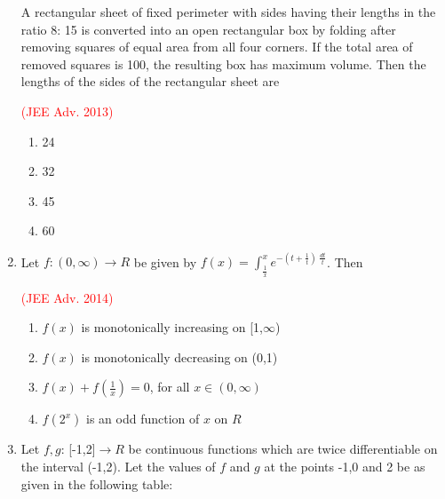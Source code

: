 \documentclass[journal,12pt,twocolumn]{IEEEtran}
\theoremstyle{remark}
\begin{document}
\begin{enumerate}[start = 7]
{        \begin{flushleft}
            A rectangular sheet of fixed perimeter with sides having their lengths in the ratio 8: 15 is converted into an open rectangular box by folding after removing squares of equal area from all four corners. If the total area of removed squares is 100, the resulting box has maximum volume. Then the lengths of the sides of the rectangular sheet are
            \begin{flushright}
                \textcolor{red}{(JEE Adv. 2013)}
            \end{flushright}
            \begin{enumerate}
                \item 24
                \item 32
                \item 45
                \item 60
            \end{enumerate}
        \end{flushleft}
        }
    \item{
        \begin{flushleft}
            Let $f: (0,\infty)\rightarrow R$ be given by $f(x) = \int_{\frac{1}{x}}^x e^{-(t + \frac{1}{t})\ \frac{dt}{t}}$. Then
            \begin{flushright}
                \textcolor{red}{(JEE Adv. 2014)}
            \end{flushright}
            \begin{enumerate}
                \item $f(x)$ is monotonically increasing on [1,$\infty$)
                \item $f(x)$ is monotonically decreasing on (0,1)
                \item $f(x) + f(\frac{1}{x}) = 0$, for all $x \in (0,\infty)$
                \item $f(2^x)$ is an odd function of $x$ on $R$ 
            \end{enumerate}
        \end{flushleft}
        }
    \item{
        \begin{flushleft}
            Let $f,g$: [-1,2]$\rightarrow R$ be continuous functions which are twice differentiable on the interval (-1,2). Let the values of $f$ and $g$ at the points -1,0 and 2 be as given in the following table:
            \begin{center}

\end{center}
\end{flushleft}}
\end{enumerate}
\end{document}
